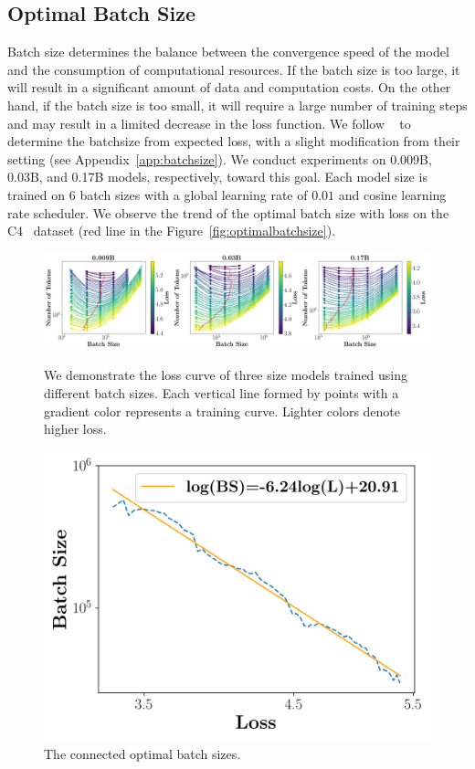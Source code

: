 \subsection{Optimal Batch Size}
Batch size determines the balance between the convergence speed of the model and the consumption of computational resources. If the batch size is too large, it will result in a significant amount of data and computation costs. On the other hand, if the batch size is too small, it will require a large number of training steps and may result in a limited decrease in the loss function. We follow ~\cite{kaplan2020scaling} to determine the batchsize from expected loss, with a slight modification from their setting (see Appendix~\ref{app:batchsize}). We conduct experiments on 0.009B, 0.03B, and 0.17B models, respectively, toward this goal. Each model size is trained on 6 batch sizes with a global learning rate of $0.01$ and cosine learning rate scheduler. We observe the trend of the optimal batch size with loss on the C4~\citep{2019t5} dataset (red line in the Figure~\ref{fig:optimalbatchsize}).

\begin{figure}[!htbp]
    \centering
    \begin{minipage}{0.66\textwidth}
        \centering
        \includegraphics[width=\linewidth]{Fig/batch_size_1.png}
    \caption{We demonstrate the loss curve of three size models trained using different batch sizes. Each vertical line formed by points with a gradient color represents a training curve. Lighter colors denote higher loss.}
    \label{fig:optimalbatchsize}
    \end{minipage}
    \begin{minipage}{0.3\textwidth}
        \centering
        \includegraphics[width=\linewidth]{Fig/batch_size_2.png}
        \caption{The connected optimal batch sizes. }
        \label{fig:optimalbatchsizeconnect}
    \end{minipage}
\end{figure}


